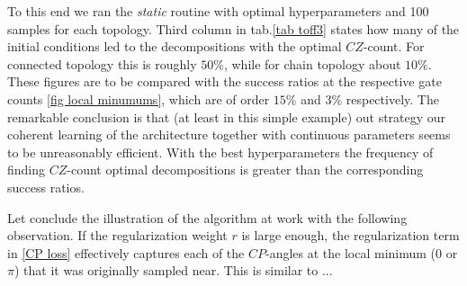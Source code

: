 \documentclass[amsfonts, amssymb, aps, nofootinbib]{revtex4-2}
\newcommand{\static}{\textit{static }}
\newcommand{\CZ}{$CZ$}
\newcommand{\CP}{$CP$}
\begin{document}
To this end we ran the \static routine with optimal hyperparameters and 100 samples for each topology. Third column in tab.\ref{tab toff3} states how many of the initial conditions led to the decompositions with the optimal \CZ-count. For connected topology this is roughly $50\%$, while for chain topology about $10\%$. These figures are to be compared with the success ratios at the respective gate counts \ref{fig local minumums}, which are of order $15\%$ and $3\%$ respectively. The remarkable conclusion is that (at least in this simple example) out strategy our coherent learning of the architecture together with continuous parameters seems to be unreasonably efficient. With the best hyperparameters the frequency of finding \CZ-count optimal decompositions is greater than the corresponding success ratios.

Let conclude the illustration of the algorithm at work with the following observation. If the regularization weight $r$ is large enough, the regularization term in \eqref{CP loss} effectively captures each of the \CP-angles at the local minimum (0 or $\pi$) that it was originally sampled near. This is similar to ...
\end{document}
